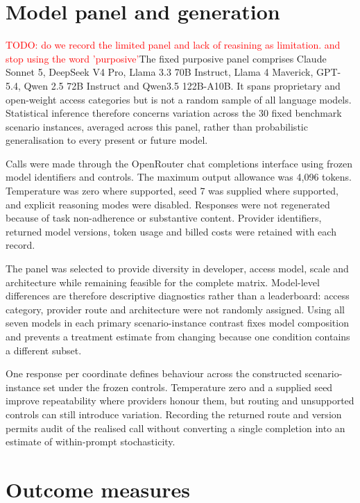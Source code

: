 \documentclass[12pt,a4paper,oneside]{report}
\newcommand{\rev}[1]{#1}
\newenvironment{revisionblock}{}{}
\begin{document}
\section[Model panel and generation]{\rev{Model panel and generation}}

\begin{revisionblock}
\textcolor{red}{TODO: do we record the limited panel and lack of reasining as limitation. and stop using the word 'purposive'}The fixed purposive panel comprises Claude Sonnet 5, DeepSeek V4 Pro, Llama 3.3 70B Instruct, Llama 4 Maverick, GPT-5.4, Qwen 2.5 72B Instruct and Qwen3.5 122B-A10B. It spans proprietary and open-weight access categories but is not a random sample of all language models. Statistical inference therefore concerns variation across the 30 fixed benchmark scenario instances, averaged across this panel, rather than probabilistic generalisation to every present or future model.

Calls were made through the OpenRouter chat completions interface using frozen model identifiers and controls. The maximum output allowance was 4,096 tokens. Temperature was zero where supported, seed 7 was supplied where supported, and explicit reasoning modes were disabled. Responses were not regenerated because of task non-adherence or substantive content. Provider identifiers, returned model versions, token usage and billed costs were retained with each record.

The panel was selected to provide diversity in developer, access model, scale and architecture while remaining feasible for the complete matrix. Model-level differences are therefore descriptive diagnostics rather than a leaderboard: access category, provider route and architecture were not randomly assigned. Using all seven models in each primary scenario-instance contrast fixes model composition and prevents a treatment estimate from changing because one condition contains a different subset.

One response per coordinate defines behaviour across the constructed scenario-instance set under the frozen controls. Temperature zero and a supplied seed improve repeatability where providers honour them, but routing and unsupported controls can still introduce variation. Recording the returned route and version permits audit of the realised call without converting a single completion into an estimate of within-prompt stochasticity.
\end{revisionblock}

\section[Outcome measures]{\rev{Outcome measures}}
\end{document}
